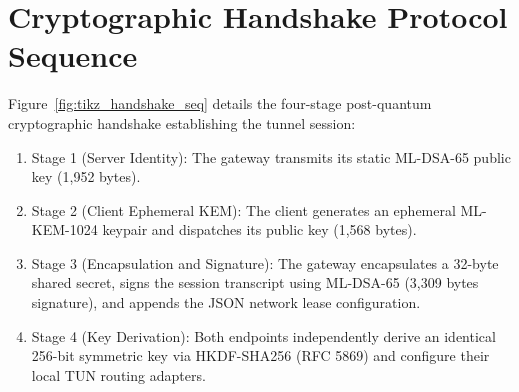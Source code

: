 \section{Cryptographic Handshake Protocol Sequence}
\label{sec:handshake_sequence}

Figure~\ref{fig:tikz_handshake_seq} details the four-stage post-quantum cryptographic handshake establishing the tunnel session:
\begin{enumerate}
    \item Stage 1 (Server Identity): The gateway transmits its static ML-DSA-65 public key (1,952 bytes).
    \item Stage 2 (Client Ephemeral KEM): The client generates an ephemeral ML-KEM-1024 keypair and dispatches its public key (1,568 bytes).
    \item Stage 3 (Encapsulation and Signature): The gateway encapsulates a 32-byte shared secret, signs the session transcript using ML-DSA-65 (3,309 bytes signature), and appends the JSON network lease configuration.
    \item Stage 4 (Key Derivation): Both endpoints independently derive an identical 256-bit symmetric key via HKDF-SHA256 (RFC 5869) and configure their local TUN routing adapters.
\end{enumerate}

